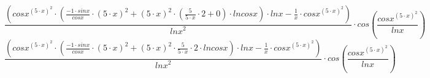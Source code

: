 \documentclass[12pt,a4paper]{article}
\begin{document}
\begin{flushleft}
\begin{equation}{{\frac {({{{{cos {x }}^ {{({5 }\cdot {x })}^ {2 }}}\cdot {({{\frac {{-1 }\cdot {sin {x }}}{cos {x }}}\cdot {{({5 }\cdot {x })}^ {2 }}}+ {{{{({5 }\cdot {x })}^ {2 }}\cdot {({{\frac {5 }{{5 }\cdot {x }}}\cdot {2 }}+ {0 })}}\cdot {ln {cos {x }}}})}}\cdot {ln {x }}}- {{\frac {1 }{x }}\cdot {{cos {x }}^ {{({5 }\cdot {x })}^ {2 }}}})}{{ln {x }}^ {2 }}}\cdot {cos {(\frac {{cos {x }}^ {{({5 }\cdot {x })}^ {2 }}}{ln {x }})}}}\end{equation}
\begin{equation}{{\frac {({{{{cos {x }}^ {{({5 }\cdot {x })}^ {2 }}}\cdot {({{\frac {{-1 }\cdot {sin {x }}}{cos {x }}}\cdot {{({5 }\cdot {x })}^ {2 }}}+ {{{{({5 }\cdot {x })}^ {2 }}\cdot {{\frac {5 }{{5 }\cdot {x }}}\cdot {2 }}}\cdot {ln {cos {x }}}})}}\cdot {ln {x }}}- {{\frac {1 }{x }}\cdot {{cos {x }}^ {{({5 }\cdot {x })}^ {2 }}}})}{{ln {x }}^ {2 }}}\cdot {cos {(\frac {{cos {x }}^ {{({5 }\cdot {x })}^ {2 }}}{ln {x }})}}}\end{equation}

\end{flushleft}
\end{document}

